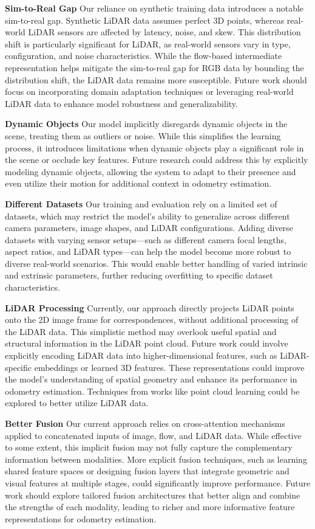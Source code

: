 \documentclass[11pt,a4paper]{article}
\begin{document}
\textbf{Sim-to-Real Gap}
Our reliance on synthetic training data introduces a notable sim-to-real gap. Synthetic LiDAR data assumes perfect 3D points, whereas real-world LiDAR sensors are affected by latency, noise, and skew. This distribution shift is particularly significant for LiDAR, as real-world sensors vary in type, configuration, and noise characteristics. While the flow-based intermediate representation helps mitigate the sim-to-real gap for RGB data by bounding the distribution shift, the LiDAR data remains more susceptible. Future work should focus on incorporating domain adaptation techniques or leveraging real-world LiDAR data to enhance model robustness and generalizability.

\textbf{Dynamic Objects}
Our model implicitly disregards dynamic objects in the scene, treating them as outliers or noise. While this simplifies the learning process, it introduces limitations when dynamic objects play a significant role in the scene or occlude key features. Future research could address this by explicitly modeling dynamic objects, allowing the system to adapt to their presence and even utilize their motion for additional context in odometry estimation.

\textbf{Different Datasets}
Our training and evaluation rely on a limited set of datasets, which may restrict the model's ability to generalize across different camera parameters, image shapes, and LiDAR configurations. Adding diverse datasets with varying sensor setups—such as different camera focal lengths, aspect ratios, and LiDAR types—can help the model become more robust to diverse real-world scenarios. This would enable better handling of varied intrinsic and extrinsic parameters, further reducing overfitting to specific dataset characteristics.

\textbf{LiDAR Processing}
Currently, our approach directly projects LiDAR points onto the 2D image frame for correspondences, without additional processing of the LiDAR data. This simplistic method may overlook useful spatial and structural information in the LiDAR point cloud. Future work could involve explicitly encoding LiDAR data into higher-dimensional features, such as LiDAR-specific embeddings or learned 3D features. These representations could improve the model’s understanding of spatial geometry and enhance its performance in odometry estimation. Techniques from works like point cloud learning could be explored to better utilize LiDAR data.

\textbf{Better Fusion}
Our current approach relies on cross-attention mechanisms applied to concatenated inputs of image, flow, and LiDAR data. While effective to some extent, this implicit fusion may not fully capture the complementary information between modalities. More explicit fusion techniques, such as learning shared feature spaces or designing fusion layers that integrate geometric and visual features at multiple stages, could significantly improve performance. Future work should explore tailored fusion architectures that better align and combine the strengths of each modality, leading to richer and more informative feature representations for odometry estimation.
\end{document}
